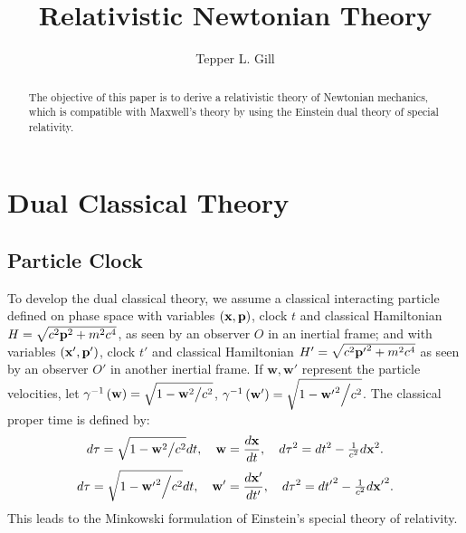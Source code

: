 \documentclass[11pt, reqno]{amsart}
\date{}
\newcommand{\beqn}{\begin{eqnarray}}
\newcommand{\eeqn}{\end{eqnarray}}
\newcommand{\lb}{\label}
\numberwithin{equation}{section}
\begin{document}
\title{\bf Relativistic Newtonian Theory}
\author[Gill]{Tepper L. Gill}
\address[Tepper L. Gill]{ Department of EECS, Mathematics, and Computation Physics Laboratory, Howard University\\
Washington DC 20059 \\ USA, {\it E-mail~:} {\tt tgill@howard.edu}}

\maketitle
\begin{abstract}  The objective of this paper is to derive a relativistic theory of Newtonian mechanics, which is compatible with Maxwell's theory by using the Einstein dual theory of special relativity.
\end{abstract}
\section{\bf{Dual Classical Theory}}
\subsection{Particle Clock}
To develop the dual classical theory, we assume a classical interacting particle defined on phase space with variables $( {\bf{x}}, {\bf{p}})$, clock $t$ and classical Hamiltonian $H=\sqrt{c^2{\bf{p}}^2+ m^2c^4}$, as seen by an observer $O$ in an inertial frame; and with variables $( {\bf{x}}', {\bf{p}}')$, clock $t'$ and classical Hamiltonian $H'=\sqrt{c^2{\bf{p}'}^2+ m^2c^4}$ as seen by an observer $O'$ in another inertial frame.       If ${\mathbf{w}}, {\mathbf{w}}'$ represent the particle velocities, let ${\gamma ^{ - 1}}\left( {\mathbf{w}}\right) = \sqrt {1 - {{{{\mathbf{w}}^2}} \mathord{\left/
 {\vphantom {{{{\mathbf{w}}^2}} {{c^2}}}} \right.
 \kern-\nulldelimiterspace} {{c^2}}}} $, ${\gamma ^{ - 1}}\left( {\mathbf{w}'}\right) = \sqrt {1 - {{{{\mathbf{w}'}^2}} \mathord{\left/
 {\vphantom {{{{\mathbf{w}'}^2}} {{c^2}}}} \right.
 \kern-\nulldelimiterspace} {{c^2}}}} $.  The classical proper time is defined by:
\beqn\lb{a1} 
d\tau  =\sqrt {1 - {{{{\mathbf{w}}^2}} \mathord{\left/
 {\vphantom {{{{\mathbf{w}}^2}} {{c^2}}}} \right.
 \kern-\nulldelimiterspace} {{c^2}}}}dt,\quad {\mathbf{w}} = \frac{{d{\mathbf{x}}}}{{dt}},\quad d{\tau^2} = d{t^2} - \tfrac{1}{{{c^2}}}d{{\mathbf{x}}^2}.
\eeqn  
\beqn\lb{b1}
d\tau  =\sqrt {1 - {{{{\mathbf{w}'}^2}} \mathord{\left/
 {\vphantom {{{{\mathbf{w}'}^2}} {{c^2}}}} \right.
 \kern-\nulldelimiterspace} {{c^2}}}}dt,\quad {\mathbf{w}'} = \frac{{d{\mathbf{x}'}}}{{dt'}},\quad d{\tau^2} = d{{t'}^2} - \tfrac{1}{{{c^2}}}d{{\mathbf{x}'}^2}.  
\eeqn
This leads to the Minkowski formulation of Einstein's special theory of relativity.
\end{document}
